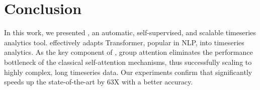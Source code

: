 \section{Conclusion}
\label{sec.conclusion}
In this work, we presented \system, an automatic, self-supervised, and scalable timeseries analytics tool. \system effectively adapts Transformer, popular in NLP, into timeseries analytics. 
As the key component of \system, group attention eliminates the performance bottleneck of the classical self-attention mechanisms, thus successfully scaling \system to highly complex, long timeseries data.
Our experiments confirm that \system significantly speeds up the state-of-the-art by 63X with a better accuracy. 

